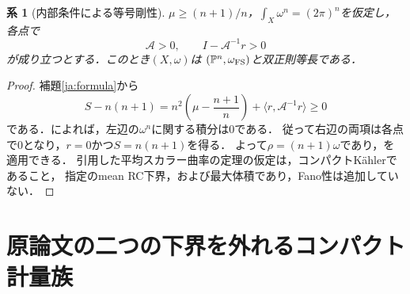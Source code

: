 \documentclass[12pt]{amsart}
\theoremstyle{definition}
\theoremstyle{remark}
\numberwithin{equation}{section}
\theoremstyle{plain}
\newtheorem{jcor}[thm]{系}
\theoremstyle{remark}
\theoremstyle{definition}
\begin{document}
\begin{jcor}[内部条件による等号剛性]\label{ja:interior}
$\mu\geq(n+1)/n$，$\int_X\omega^n=(2\pi)^n$を仮定し，各点で
\[
 \mathcal A>0,\qquad I-\mathcal A^{-1}r>0
\]
が成り立つとする．このとき$(X,\omega)$は
$(\mathbb P^n,\omega_{\rm FS})$と双正則等長である．
\end{jcor}

\begin{proof}
補題\ref{ja:formula}から
\[
 S-n(n+1)=n^2\left(\mu-\frac{n+1}{n}\right)
          +\langle r,\mathcal A^{-1}r\rangle\geq0
\]
である．\cite[Theorem 5.2]{ja:DS}によれば，左辺の$\omega^n$に関する積分は0である．
従って右辺の両項は各点で0となり，$r=0$かつ$S=n(n+1)$を得る．
よって$\rho=(n+1)\omega$であり，\cite[Corollary 5.3(2)]{ja:DS}を適用できる．
引用した平均スカラー曲率の定理の仮定は，コンパクトK\"ahlerであること，
指定のmean RC下界，および最大体積であり，Fano性は追加していない．
\end{proof}

\section{原論文の二つの下界を外れるコンパクト計量族}\label{ja:examples}
\end{document}
